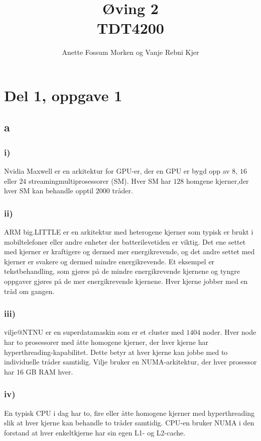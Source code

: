 \documentclass[12pt, a4paper]{article} %
\title{Øving 2\\ TDT4200}
\author[1]{Anette Fossum Morken og Vanje Rebni Kjer}
\date{}
\begin{document}
\maketitle

\section*{Del 1, oppgave 1}
\subsection*{a}
\subsubsection*{i)}
Nvidia Maxwell er en arkitektur for GPU-er, der en GPU er bygd opp av $ 8$, $16 $ eller $ 24 $ streamingmultiprosessorer (SM). Hver SM har $ 128 $ homgene kjerner,der hver SM kan behandle opptil $ 2000 $ tråder.
\subsubsection*{ii)}
ARM big.LITTLE er en arkitektur med heterogene kjerner som typisk er brukt i mobiltelefoner eller andre enheter der batterilevetiden er viktig. Det ene settet med kjerner er kraftigere og dermed mer energikrevende, og det andre settet med kjerner er svakere og dermed mindre energikrevende. Et eksempel er tekstbehandling, som gjøres på de mindre energikrevende kjernene og tyngre oppgaver gjøres på de mer energikrevende kjernene. Hver kjerne jobber med en tråd om gangen.

\subsubsection*{iii)}
vilje@NTNU er en superdatamaskin som er et cluster med $1404$ noder. Hver node har to prosessorer med åtte homogene kjerner, der hver kjerne har hyperthreading-kapabilitet. Dette betyr at hver kjerne kan jobbe med to individuelle tråder samtidig. Vilje bruker en NUMA-arkitektur, der hver prosessor har 16 GB RAM hver.

\subsubsection*{iv)}
En typisk CPU i dag har to, fire eller åtte homogene kjerner med hyperthreading slik at hver kjerne kan behandle to tråder samtidig. CPU-en bruker NUMA i den forstand at hver enkeltkjerne har sin egen L1- og L2-cache. 
\end{document}
